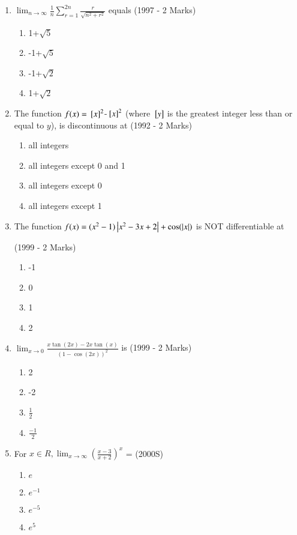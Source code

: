 \documentclass[journal,12pt,onecolumn]{IEEEtran}
\theoremstyle{remark}
\begin{document}
\begin{enumerate}
\item $\lim_{n\to \infty}\frac{1}{n}\sum_{r=1}^{2n}\frac{r}{\sqrt{n^2+r^2}}$ equals
\hfill(1997 - 2 Marks)
  \begin{enumerate}
      \item 1+$\sqrt{5}$
      \item -1+$\sqrt{5}$
      \item -1+$\sqrt{2}$
      \item 1+$\sqrt{2}$
      
  \end{enumerate}

\item The function $f(x)={}\left[x\right]^2$-${}\left[x\right]^2$ (where ${}\left[y\right]$ is the greatest integer less than or equal to $y$), is discontinuous at
\hfill(1992 - 2 Marks)
     \begin{enumerate}
         \item all integers
         \item all integers except 0 and 1
         \item all integers except 0
         \item all integers except 1
         
     \end{enumerate}

\item The function $f(x)=(x^2-1)\left\vert x^2-3x+2\right\vert+\cos(\left\vert x\right\vert)$ is NOT differentiable at

  \hfill(1999 - 2 Marks)
     \begin{enumerate}
         \item -1
         \item 0
         \item 1
         \item 2
         
     \end{enumerate}

\item $\lim_{x\to0}$$\frac{x\tan(2x)-2x\tan(x)}{(1-\cos(2x))^2}$ is
  \hfill(1999 - 2 Marks)
    \begin{enumerate}
        \item 2
        
        \item -2

        \item $\frac{1}{2}$
        
        \item $\frac{-1}{2}$
        
    \end{enumerate}

\item For $x\in R, \lim_{x\to \infty}(\frac{x-3}{x+2})^x$ =
 \hfill(2000S)
   \begin{enumerate}
       \item $e$
       \item $e^{-1}$
       \item $e^{-5}$
       \item $e^{5}$
       
   \end{enumerate}

\end{enumerate}
\end{document}

